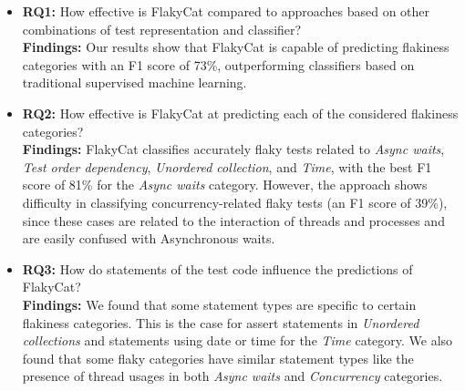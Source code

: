 \begin{itemize}
    \item \textsc{\textbf{RQ1:}} How effective is FlakyCat compared to approaches based on other combinations of test representation and classifier? \\
    \textbf{Findings:} Our results show that FlakyCat is capable of predicting flakiness categories with an F1 score of 73\%, outperforming classifiers based on traditional supervised machine learning. %

    \item \textsc{\textbf{RQ2:}} How effective is FlakyCat at predicting each of the considered flakiness categories?\\
    \textbf{Findings:} FlakyCat classifies accurately flaky tests related to \textit{Async waits}, \textit{Test order dependency}, \textit{Unordered collection}, and \textit{Time}, with the best F1 score of 81\% for the \textit{Async waits} category. However, the approach shows difficulty in classifying concurrency-related flaky tests (an F1 score of 39\%), since these cases are related to the interaction of threads and processes and are easily confused with Asynchronous waits. 

    \item \textsc{\textbf{RQ3:}} How do statements of the test code influence the predictions of FlakyCat?\\
    \textbf{Findings:} We found that some statement types are specific to certain flakiness categories. This is the case for assert statements in \textit{Unordered collections} and statements using date or time for the \textit{Time} category. We also found that some flaky categories have similar statement types like the presence of thread usages in both \textit{Async waits} and \textit{Concurrency} categories.
\end{itemize}

